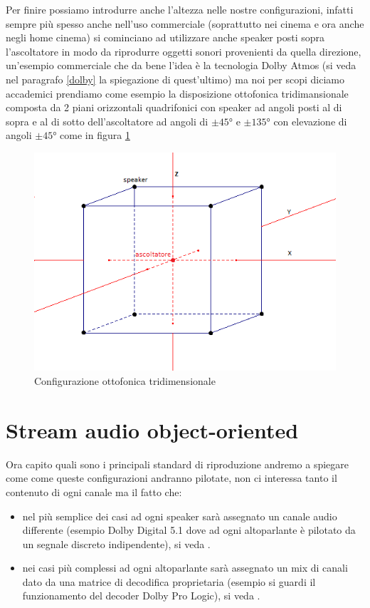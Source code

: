 \documentclass[12pt,a4paper]{report}
\begin{document}
Per finire possiamo introdurre anche l'altezza nelle nostre configurazioni, infatti sempre più spesso anche nell'uso commerciale (soprattutto nei cinema e ora anche negli home cinema) si cominciano ad utilizzare anche speaker posti sopra l'ascoltatore in modo da riprodurre oggetti sonori provenienti da quella direzione, un'esempio commerciale che da bene l'idea è la tecnologia Dolby Atmos (si veda nel paragrafo \ref{dolby} la spiegazione di quest'ultimo) ma noi per scopi diciamo accademici prendiamo come esempio la disposizione ottofonica tridimansionale composta da 2 piani orizzontali quadrifonici con speaker ad angoli  posti al di sopra e al di sotto dell'ascoltatore ad angoli di $\pm45°$ e $\pm135°$ con elevazione di angoli $\pm 45°$ come in figura \ref{fig:ottofonia}

\begin{figure}[htbp]
	\centering
	\includegraphics[scale=0.70]{figures/cubo4.png}
	\caption {Configurazione ottofonica tridimensionale} 
	\label{fig:ottofonia}
	\end{figure}

\section{Stream audio object-oriented}

Ora capito quali sono i principali standard di riproduzione andremo a spiegare come come queste configurazioni andranno pilotate, non ci interessa tanto il contenuto di ogni canale ma il fatto che: 

\begin{itemize}
\item nel più semplice dei casi ad ogni speaker sarà assegnato un canale audio differente (esempio Dolby Digital 5.1 dove ad ogni altoparlante è pilotato da un segnale discreto indipendente), si veda \cite{digital}.
\item nei casi più complessi ad ogni altoparlante sarà assegnato un mix di canali dato da una matrice di decodifica proprietaria (esempio si guardi il funzionamento del decoder Dolby Pro Logic), si veda \cite{prologic}.
\end{itemize}
\end{document}
